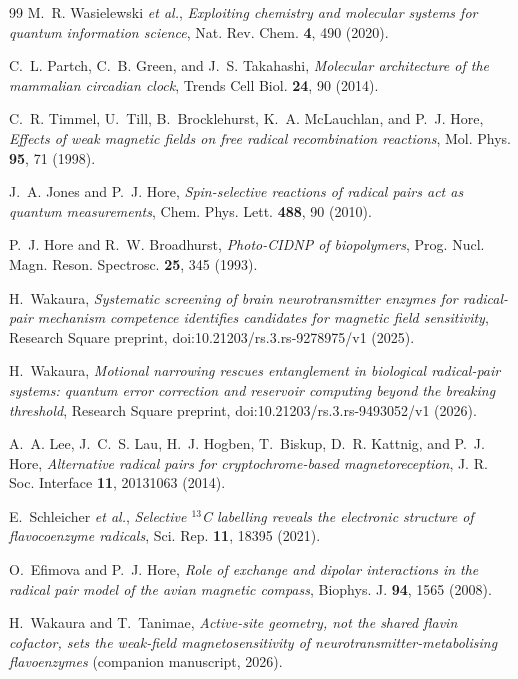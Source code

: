 \documentclass[aps,prx,reprint,superscriptaddress,nofootinbib,floatfix]{revtex4-2}
\begin{document}
\begin{thebibliography}{99}
 M.~R. Wasielewski \textit{et al.},
\textit{Exploiting chemistry and molecular systems for quantum information science},
Nat. Rev. Chem. \textbf{4}, 490 (2020).

 C.~L. Partch, C.~B. Green, and J.~S. Takahashi,
\textit{Molecular architecture of the mammalian circadian clock},
Trends Cell Biol. \textbf{24}, 90 (2014).

 C.~R. Timmel, U.~Till, B.~Brocklehurst, K.~A. McLauchlan,
and P.~J. Hore, \textit{Effects of weak magnetic fields on free radical
recombination reactions}, Mol. Phys. \textbf{95}, 71 (1998).

 J.~A. Jones and P.~J. Hore,
\textit{Spin-selective reactions of radical pairs act as quantum measurements},
Chem. Phys. Lett. \textbf{488}, 90 (2010).

 P.~J. Hore and R.~W. Broadhurst,
\textit{Photo-CIDNP of biopolymers},
Prog. Nucl. Magn. Reson. Spectrosc. \textbf{25}, 345 (1993).

 H.~Wakaura,
\textit{Systematic screening of brain neurotransmitter enzymes for radical-pair
mechanism competence identifies candidates for magnetic field sensitivity},
Research Square preprint, doi:10.21203/rs.3.rs-9278975/v1 (2025).

 H.~Wakaura,
\textit{Motional narrowing rescues entanglement in biological radical-pair systems:
quantum error correction and reservoir computing beyond the breaking threshold},
Research Square preprint, doi:10.21203/rs.3.rs-9493052/v1 (2026).

 A.~A. Lee, J.~C.~S. Lau, H.~J. Hogben, T.~Biskup, D.~R. Kattnig,
and P.~J. Hore,
\textit{Alternative radical pairs for cryptochrome-based magnetoreception},
J. R. Soc. Interface \textbf{11}, 20131063 (2014).

 E.~Schleicher \textit{et al.},
\textit{Selective $^{13}$C labelling reveals the electronic structure of
flavocoenzyme radicals}, Sci. Rep. \textbf{11}, 18395 (2021).

 O.~Efimova and P.~J. Hore,
\textit{Role of exchange and dipolar interactions in the radical pair model of the
avian magnetic compass}, Biophys. J. \textbf{94}, 1565 (2008).

 H.~Wakaura and T.~Tanimae,
\textit{Active-site geometry, not the shared flavin cofactor, sets the
weak-field magnetosensitivity of neurotransmitter-metabolising flavoenzymes}
(companion manuscript, 2026).


\end{thebibliography}
\end{document}
